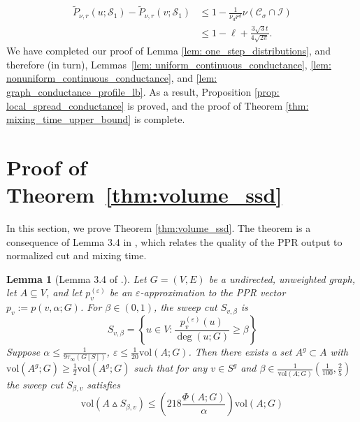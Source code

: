 \documentclass[11pt,twoside]{article}
\newtheorem{lemma}{Lemma}
\newcommand{\set}[1]{\left\{#1\right\}}
\newcommand{\vol}{\mathrm{vol}}
\newcommand{\1}{\mathbf{1}}
\newcommand{\Sset}{\mathcal{S}}
\newcommand{\Cset}{\mathcal{C}}
\newcommand{\Csig}{\Cset_{\sigma}}
\begin{document}
\begin{align*}
\widetilde{P}_{\nu,r}(u; \Sset_1) - \widetilde{P}_{\nu,r}(v; \Sset_1) & \leq  1 - \frac{1}{\nu_d r^d} \nu(\Csig \cap \mathcal{I}) \\
& \leq 1 - \ell + \frac{3 \sqrt{3} t}{4\sqrt{2\pi}}.
\end{align*}
We have completed our proof of Lemma \ref{lem: one_step_distributions}, and therefore (in turn), Lemmas~\ref{lem: uniform_continuous_conductance}, \ref{lem: nonuniform_continuous_conductance}, and \ref{lem: graph_conductance_profile_lb}. As a result, Proposition \ref{prop: local_spread_conductance} is proved, and the proof of Theorem \ref{thm: mixing_time_upper_bound} is complete.

\section{Proof of Theorem~\ref{thm:volume_ssd}}
\label{sec:proof_of_volume_ssd}

In this section, we prove Theorem \ref{thm:volume_ssd}. The theorem is a consequence of Lemma 3.4 in \citet{zhu2013}, which relates the quality of the PPR output to normalized cut and mixing time. 
\begin{lemma}[Lemma 3.4 of \citet{zhu2013}.]
	\label{lem:zhu}
	Let $G = (V,E)$ be a undirected, unweighted graph, let $A \subseteq V$, and let $p_v^{(\varepsilon)}$ be an $\varepsilon$-approximation to the PPR vector $p_v := p(v,\alpha;G)$. For $\beta \in (0,1)$,  the sweep cut $S_{v,\beta}$ is
	\begin{equation*}
	S_{v,\beta} = \set{u \in V: \frac{p_v^{(\varepsilon)}(u)}{\deg(u;G)} \geq \beta}
	\end{equation*} Suppose $\alpha \leq \frac{1}{9 \tau_{\infty}(G[S])}$,  $\varepsilon \leq \frac{1}{20}\vol(A;G)$. Then there exists a set $A^g \subset A$ with $\vol(A^g;G) \geq \frac{1}{2}\vol(A^g;G)$ such that for any $v \in S^g$ and $\beta \in \frac{1}{\vol(A;G)}(\frac{1}{100},\frac{2}{5})$ the sweep cut $S_{\beta,v}$ satisfies
	\begin{equation*}
	\vol(A \vartriangle S_{\beta,v}) \leq \left(218\frac{\Phi(A;G)}{\alpha}\right) \vol(A;G)
	\end{equation*}
\end{lemma}
\end{document}
